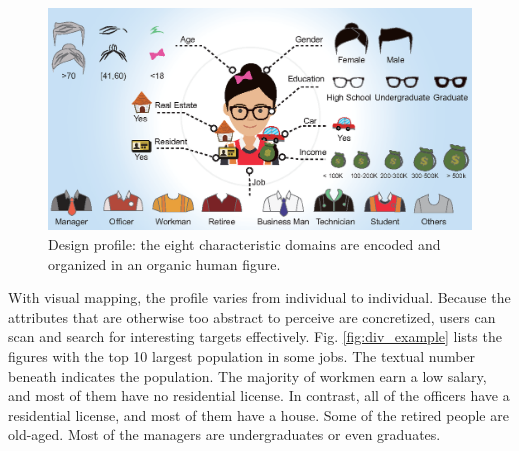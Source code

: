\documentclass{ieeeaccess}
\begin{document}
\begin{figure}[htb!]
 \centering %
 \includegraphics[width=\columnwidth]{pictures/design_profile}
 \caption{Design profile: the eight characteristic domains are encoded and organized in an organic human figure.}
 \label{fig:design_profile}
\end{figure}

With visual mapping, the profile varies from individual to individual. Because the attributes that are otherwise too abstract to perceive are concretized, users can scan and search for interesting targets effectively. Fig. \ref{fig:div_example} lists the figures with the top 10 largest population in some jobs. The textual number beneath indicates the population. The majority of workmen earn a low salary, and most of them have no residential license. In contrast, all of the officers have a residential license, and most of them have a house. Some of the retired people are old-aged. Most of the managers are undergraduates or even graduates.
\end{document}
